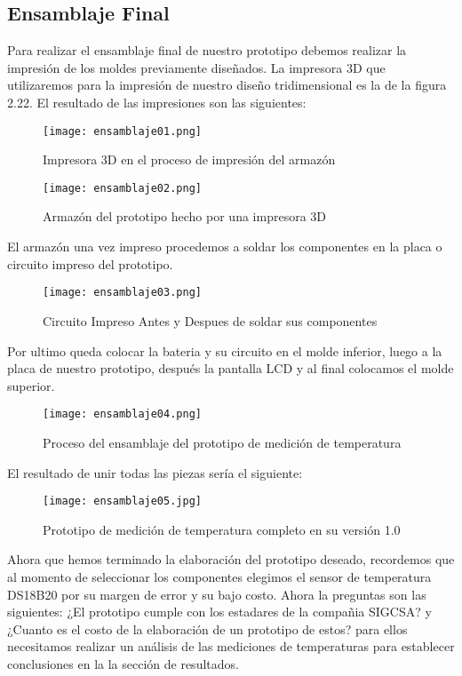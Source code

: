 \subsection{Ensamblaje Final}

\par \noindent
Para realizar el ensamblaje final de nuestro prototipo debemos realizar la impresión de los moldes previamente diseñados. La impresora 3D que utilizaremos para la impresión de nuestro diseño tridimensional es la de la figura 2.22. El resultado de las impresiones son las siguientes:

\begin{figure}[H]
	\centering
	\texttt{[image: ensamblaje01.png]}
	\caption{Impresora 3D en el proceso de impresión del armazón}
\end{figure}

\begin{figure}[H]
	\centering
	\texttt{[image: ensamblaje02.png]}
	\caption{Armazón del prototipo hecho por una impresora 3D}
\end{figure}

\par \noindent
El armazón una vez impreso procedemos a soldar los componentes en la placa o circuito impreso del prototipo.

\begin{figure}[H]
	\centering
	\texttt{[image: ensamblaje03.png]}
	\caption{Circuito Impreso Antes y Despues de soldar sus componentes}
\end{figure}

\par \noindent
Por ultimo queda colocar la bateria y su circuito en el molde inferior, luego a la placa de nuestro prototipo, después la pantalla LCD y al final colocamos el molde superior.

\begin{figure}[H]
	\centering
	\texttt{[image: ensamblaje04.png]}
	\caption{Proceso del ensamblaje del prototipo de medición de temperatura}
\end{figure}

\par \noindent
El resultado de unir todas las piezas sería el siguiente:

\begin{figure}[H]
	\centering
	\texttt{[image: ensamblaje05.jpg]}
	\caption{Prototipo de medición de temperatura completo en su versión 1.0}
\end{figure}

\par \noindent
Ahora que hemos terminado la elaboración del prototipo deseado, recordemos que al momento de seleccionar los componentes elegimos el sensor de temperatura DS18B20 por su margen de error y su bajo costo. Ahora la preguntas son las siguientes: ¿El prototipo cumple con los estadares de la compañia SIGCSA? y ¿Cuanto es el costo de la elaboración de un prototipo de estos? para ellos necesitamos realizar un análisis de las mediciones de temperaturas para establecer conclusiones en la la sección de resultados.